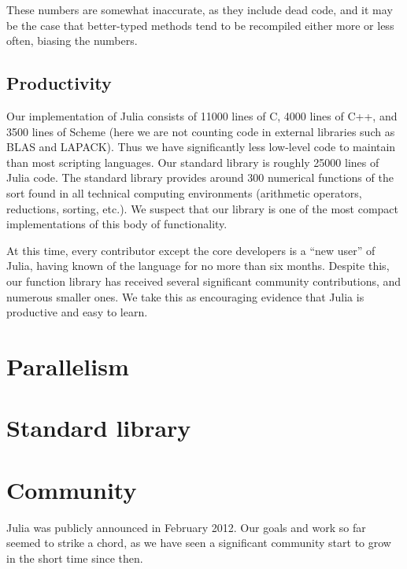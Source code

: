 \documentclass[9pt]{sigplanconf}
\begin{document}
These numbers are somewhat inaccurate, as they include dead code, and
it may be the case that better-typed methods tend to be recompiled either
more or less often, biasing the numbers.


\subsection{Productivity}

Our implementation of Julia consists of 11000 lines of C, 4000 lines of C++,
and 3500 lines of Scheme (here we are not counting code in external
libraries such as BLAS and LAPACK).
Thus we have significantly less low-level code to maintain than most scripting
languages. 
Our standard library is roughly 25000 lines of Julia code.
The standard library provides around 300 numerical functions
of the sort found in all technical computing environments (arithmetic
operators, reductions, sorting, etc.). We suspect that our library is
one of the most compact implementations of this body of functionality.

At this time, every contributor except the core developers is a ``new user''
of Julia, having known of the language for no more than six months.
Despite this, our function library has received several significant
community contributions, and numerous smaller ones. We take this as
encouraging evidence that Julia is productive and easy to learn.


\section{Parallelism}


\section{Standard library}

\section{Community}

Julia was publicly announced in February 2012. Our goals and work so
far seemed to strike a chord, as we have seen a significant community
start to grow in the short time since then.
\end{document}
